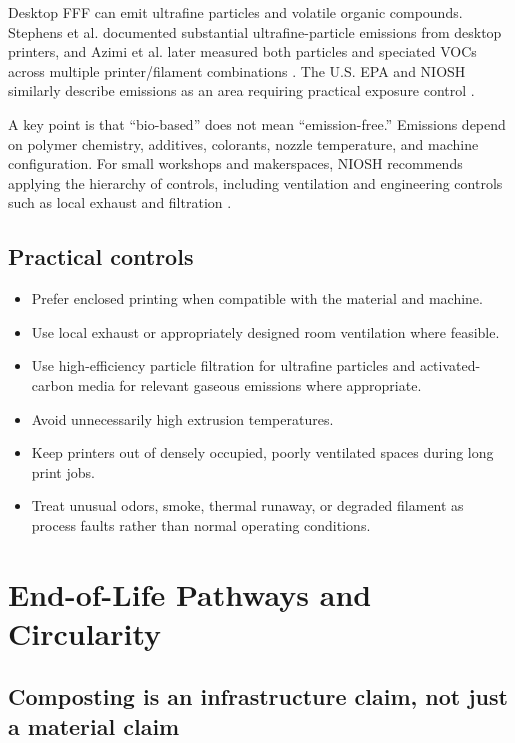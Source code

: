 \documentclass[11pt]{article}
\begin{document}
Desktop FFF can emit ultrafine particles and volatile organic compounds. Stephens et al. documented substantial ultrafine-particle emissions from desktop printers, and Azimi et al. later measured both particles and speciated VOCs across multiple printer/filament combinations \cite{stephens2013,azimi2016}. The U.S. EPA and NIOSH similarly describe emissions as an area requiring practical exposure control \cite{epa3dprinting,niosh2023}.

A key point is that ``bio-based'' does not mean ``emission-free.'' Emissions depend on polymer chemistry, additives, colorants, nozzle temperature, and machine configuration. For small workshops and makerspaces, NIOSH recommends applying the hierarchy of controls, including ventilation and engineering controls such as local exhaust and filtration \cite{niosh2023}.

\subsection{Practical controls}

\begin{itemize}
  \item Prefer enclosed printing when compatible with the material and machine.
  \item Use local exhaust or appropriately designed room ventilation where feasible.
  \item Use high-efficiency particle filtration for ultrafine particles and activated-carbon media for relevant gaseous emissions where appropriate.
  \item Avoid unnecessarily high extrusion temperatures.
  \item Keep printers out of densely occupied, poorly ventilated spaces during long print jobs.
  \item Treat unusual odors, smoke, thermal runaway, or degraded filament as process faults rather than normal operating conditions.
\end{itemize}

\section{End-of-Life Pathways and Circularity}

\subsection{Composting is an infrastructure claim, not just a material claim}
\end{document}
